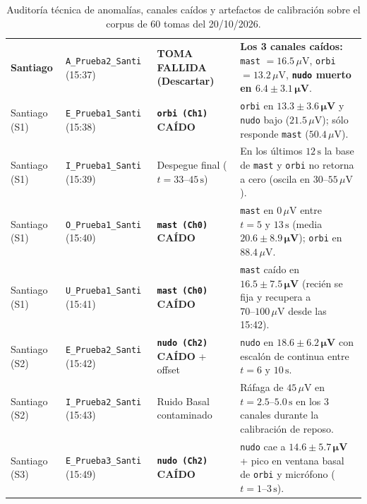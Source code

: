 \documentclass[11pt,a4paper]{article}
\begin{document}
\begin{table}[H]
\begin{tabularx}{\textwidth}{l l p{3.6cm} X}
\textbf{Santiago} & \texttt{A\_Prueba2\_Santi} (15:37) & \textbf{TOMA FALLIDA (Descartar)} & \textbf{Los 3 canales caídos:} \texttt{mast} $=16.5\,\mu\text{V}$, \texttt{orbi} $=13.2\,\mu\text{V}$, \textbf{\texttt{nudo} muerto en $\mathbf{6.4 \pm 3.1\,\mu\text{V}}$}. \\
Santiago (S1) & \texttt{E\_Prueba1\_Santi} (15:38) & \textbf{\texttt{orbi (Ch1)} CAÍDO} & \texttt{orbi} en $\mathbf{13.3 \pm 3.6\,\mu\text{V}}$ y \texttt{nudo} bajo ($21.5\,\mu\text{V}$); sólo responde \texttt{mast} ($50.4\,\mu\text{V}$). \\
Santiago (S1) & \texttt{I\_Prueba1\_Santi} (15:39) & Despegue final ($t=33\text{--}45\,\text{s}$) & En los últimos $12\,\text{s}$ la base de \texttt{mast} y \texttt{orbi} no retorna a cero (oscila en $30\text{--}55\,\mu\text{V}$). \\
Santiago (S1) & \texttt{O\_Prueba1\_Santi} (15:40) & \textbf{\texttt{mast (Ch0)} CAÍDO} & \texttt{mast} en $0\,\mu\text{V}$ entre $t=5\text{ y }13\,\text{s}$ (media $\mathbf{20.6 \pm 8.9\,\mu\text{V}}$); \texttt{orbi} en $88.4\,\mu\text{V}$. \\
Santiago (S1) & \texttt{U\_Prueba1\_Santi} (15:41) & \textbf{\texttt{mast (Ch0)} CAÍDO} & \texttt{mast} caído en $\mathbf{16.5 \pm 7.5\,\mu\text{V}}$ (recién se fija y recupera a $70\text{--}100\,\mu\text{V}$ desde las 15:42). \\
Santiago (S2) & \texttt{E\_Prueba2\_Santi} (15:42) & \textbf{\texttt{nudo (Ch2)} CAÍDO} + offset & \texttt{nudo} en $\mathbf{18.6 \pm 6.2\,\mu\text{V}}$ con escalón de continua entre $t=6\text{ y }10\,\text{s}$. \\
Santiago (S2) & \texttt{I\_Prueba2\_Santi} (15:43) & Ruido Basal contaminado & Ráfaga de $45\,\mu\text{V}$ en $t=2.5\text{--}5.0\,\text{s}$ en los 3 canales durante la calibración de reposo. \\
Santiago (S3) & \texttt{E\_Prueba3\_Santi} (15:49) & \textbf{\texttt{nudo (Ch2)} CAÍDO} & \texttt{nudo} cae a $\mathbf{14.6 \pm 5.7\,\mu\text{V}}$ + pico en ventana basal de \texttt{orbi} y micrófono ($t=1\text{--}3\,\text{s}$). \\
\bottomrule
\end{tabularx}
\caption{Auditoría técnica de anomalías, canales caídos y artefactos de calibración sobre el corpus de 60 tomas del 20/10/2026.}
\label{tab:auditoria_60_tomas}
\end{table}
\end{document}
